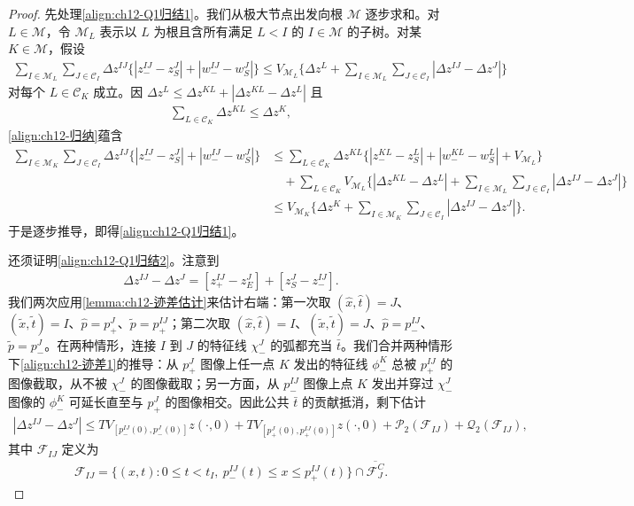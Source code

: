 \documentclass[../../main.tex]{subfiles}
\begin{document}
\begin{proof}
先处理\eqref{align:ch12-Q1归结1}。我们从极大节点出发向根 $\mathscr{M}$ 逐步求和。对 $L\in\mathscr{M}$，令 $\mathscr{M}_L$ 表示以 $L$ 为根且含所有满足 $L<I$ 的 $I\in\mathscr{M}$ 的子树。对某 $K\in\mathscr{M}$，假设
\begin{align}
\sum_{I\in\mathscr{M}_L}\sum_{J\in\mathscr{C}_I}\Delta z^{IJ}\{|z_-^{IJ}-z_S^J|+|w_-^{IJ}-w_S^J|\}\leqslant V_{\mathscr{M}_L}\{\Delta z^L+\sum_{I\in\mathscr{M}_L}\sum_{J\in\mathscr{C}_I}|\Delta z^{IJ}-\Delta z^J|\}
\label{align:ch12-归纳}
\end{align}
对每个 $L\in\mathscr{C}_K$ 成立。因 $\Delta z^L\leqslant\Delta z^{KL}+|\Delta z^{KL}-\Delta z^L|$ 且
\begin{align}
\sum_{L\in\mathscr{C}_K}\Delta z^{KL}\leqslant\Delta z^K,
\label{align:ch12-和KL}
\end{align}
\eqref{align:ch12-归纳}蕴含
\begin{align}
\sum_{I\in\mathscr{M}_K}\sum_{J\in\mathscr{C}_I}\Delta z^{IJ}\{|z_-^{IJ}-z_S^J|+|w_-^{IJ}-w_S^J|\}
&\leqslant\sum_{L\in\mathscr{C}_K}\Delta z^{KL}\{|z_-^{KL}-z_S^L|+|w_-^{KL}-w_S^L|+V_{\mathscr{M}_L}\}\nonumber\\
&\quad+\sum_{L\in\mathscr{C}_K}V_{\mathscr{M}_L}\{|\Delta z^{KL}-\Delta z^L|+\sum_{I\in\mathscr{M}_L}\sum_{J\in\mathscr{C}_I}|\Delta z^{IJ}-\Delta z^J|\}\nonumber\\
&\leqslant V_{\mathscr{M}_K}\{\Delta z^K+\sum_{I\in\mathscr{M}_K}\sum_{J\in\mathscr{C}_I}|\Delta z^{IJ}-\Delta z^J|\}.
\label{align:ch12-归纳步}
\end{align}
于是逐步推导，即得\eqref{align:ch12-Q1归结1}。

还须证明\eqref{align:ch12-Q1归结2}。注意到
\begin{align}
\Delta z^{IJ}-\Delta z^J=[z_+^{IJ}-z_E^J]+[z_S^J-z_-^{IJ}].
\label{align:ch12-差分解}
\end{align}
我们两次应用\cref{lemma:ch12-迹差估计}来估计右端：第一次取 $(\hat x,\hat t)=J$、$(\tilde x,\tilde t)=I$、$\hat p=p_+^J$、$\tilde p=p_+^{IJ}$；第二次取 $(\hat x,\hat t)=I$、$(\tilde x,\tilde t)=J$、$\hat p=p_-^{IJ}$、$\tilde p=p_-^J$。在两种情形，连接 $I$ 到 $J$ 的特征线 $\chi_-^J$ 的弧都充当 $\bar t$。我们合并两种情形下\eqref{align:ch12-迹差1}的推导：从 $p_+^J$ 图像上任一点 $K$ 发出的特征线 $\phi_-^K$ 总被 $p_+^{IJ}$ 的图像截取，从不被 $\chi_-^J$ 的图像截取；另一方面，从 $p_-^{IJ}$ 图像上点 $K$ 发出并穿过 $\chi_-^J$ 图像的 $\phi_-^K$ 可延长直至与 $p_+^J$ 的图像相交。因此公共 $\bar t$ 的贡献抵消，剩下估计
\begin{align}
|\Delta z^{IJ}-\Delta z^J|\leqslant TV_{[p_-^{IJ}(0),p_-^J(0)]}z(\cdot,0)+TV_{[p_+^J(0),p_+^{IJ}(0)]}z(\cdot,0)+\mathscr{P}_2(\mathscr{F}_{IJ})+\mathscr{Q}_2(\mathscr{F}_{IJ}),
\label{align:ch12-差界}
\end{align}
其中 $\mathscr{F}_{IJ}$ 定义为
\begin{align}
\mathscr{F}_{IJ}=\{(x,t):0\leqslant t<t_I,\ p_-^{IJ}(t)\leqslant x\leqslant p_+^{IJ}(t)\}\cap\overline{\mathscr{F}_J^C}.
\label{align:ch12-FIJ}
\end{align}


\end{proof}
\end{document}
